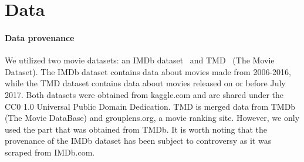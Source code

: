 \section{Data}

    \paragraph{Data provenance}
        We utilized two movie datasets: an IMDb dataset~\cite{data:IMDb} and
            TMD~\cite{data:TMD} (The Movie Dataset).
        The IMDb dataset contains data about movies made from 2006-2016, while the TMD
            dataset contains data about movies released on or before July 2017.
        Both datasets were obtained from kaggle.com and are shared under the CC0 1.0
            Universal Public Domain Dedication.
        TMD is merged data from TMDb (The Movie DataBase) and grouplens.org, a movie
            ranking site.
        However, we only used the part that was obtained from TMDb.
        It is worth noting that the provenance of the IMDb dataset has been subject to
            controversy as it was scraped from IMDb.com.

